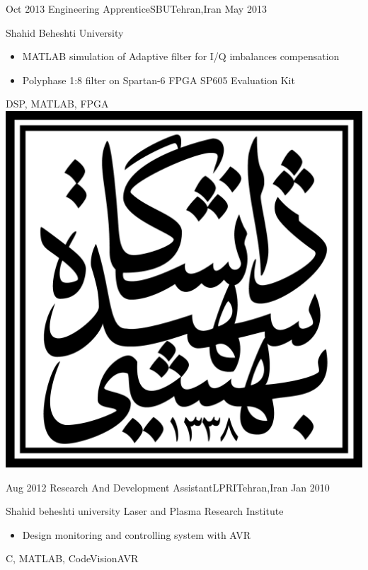 \begin{experiences}
  \emptySeparator

  \experience
  {Oct 2013} {Engineering Apprentice}{SBU}{Tehran,Iran}
  {May 2013} {
    Shahid Beheshti University
    \begin{itemize}
      \item MATLAB simulation of Adaptive filter for I/Q imbalances compensation
      \item Polyphase 1:8 filter on Spartan-6 FPGA SP605 Evaluation Kit
    \end{itemize}
  }
  {DSP, MATLAB, FPGA}
  {\includegraphics[scale=0.05]{graphics/SBU_logo}}

  \emptySeparator

  \experience
  {Aug 2012} {Research And Development Assistant}{LPRI}{Tehran,Iran}
  {Jan 2010} {
    Shahid beheshti university Laser and Plasma Research Institute
    \begin{itemize}
      \item Design  monitoring and controlling system with AVR
    \end{itemize}
  }
  {C, MATLAB, CodeVisionAVR}
  {}

  \emptySeparator

\end{experiences}
